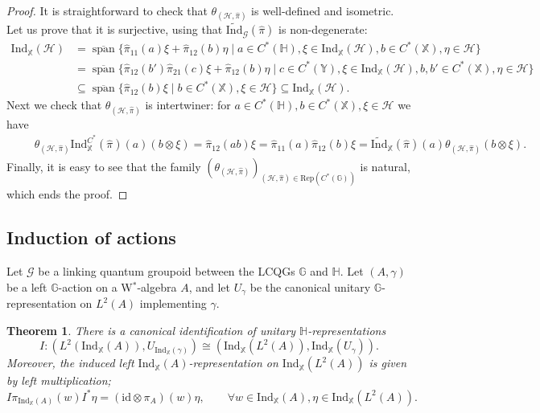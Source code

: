 \documentclass[reqno]{amsart}
\numberwithin{equation}{section}
\newtheorem{Theorem}{Theorem}[section]
\newcommand{\id}{\mathrm{id}}
\newcommand{\G}{\mathbb{G}}
\newcommand{\Hh}{\mathbb{H}}
\newcommand{\X}{\mathbb{X}}
\newcommand{\Y}{\mathbb{Y}}
\newcommand{\msG}{\mathscr{G}}
\newcommand{\Rep}{\mathrm{Rep}}
\newcommand{\Ind}{\mathrm{Ind}}
\newcommand{\ov}{\overline}
\newcommand{\mc}{\mathcal}
\newcommand{\HH}{\mathbb{H}}
\newcommand{\GG}{\mathbb{G}}
\begin{document}
\begin{proof}
It is straightforward to check that $\theta_{(\mc{H},\hat{\pi})}$ is well-defined and isometric. Let us prove that it is surjective, using that $\widetilde{\Ind}_{\msG}(\hat{\pi})$ is non-degenerate:
\[\begin{split}
\Ind_{\X}(\mc{H})&=
\ov{\operatorname{span}}\{ \hat{\pi}_{11}(a)\xi + \hat{\pi}_{12}(b)\eta\mid a\in C^*(\HH),\xi\in \Ind_{\X}(\mc{H}), b\in C^*(\X), \eta\in \mc{H}\}\\
&=
\ov{\operatorname{span}}\{ \hat{\pi}_{12}(b')\hat{\pi}_{21}(c)\xi + \hat{\pi}_{12}(b)\eta\mid c\in C^*(\Y),\xi\in \Ind_{\X}(\mc{H}), b,b'\in C^*(\X), \eta\in \mc{H}\}\\
&\subseteq 
\ov{\operatorname{span}}\{  \hat{\pi}_{12}(b)\xi\mid b\in C^*(\X),\xi\in \mc{H} \}\subseteq \Ind_{\X}(\mc{H}).
\end{split}\]
Next we check that $\theta_{(\mc{H},\hat{\pi})}$ is intertwiner: for $a\in C^*(\HH),b\in C^*(\X),\xi\in \mc{H}$ we have
\[\begin{split}
&\quad\;
\theta_{(\mc{H},\hat{\pi})} \Ind_{\X}^{C^*}(\hat{\pi})(a) (b\otimes \xi)=
 \hat{\pi}_{12}(ab)\xi=
 \hat{\pi}_{11}(a)\hat{\pi}_{12}(b)\xi=
 \widetilde{\Ind}_{\X}(\hat{\pi})(a) \theta_{(\mc{H},\hat{\pi})}(b\otimes \xi).
\end{split}\]
Finally, it is easy to see that the family $(\theta_{(\mc{H},\hat{\pi})})_{(\mc{H},\hat{\pi})\in \Rep(C^*(\GG))}$ is natural, which ends the proof.
\end{proof}

\subsection{Induction of actions}\label{SubSecStatement}


Let $\msG$ be a linking quantum groupoid between the LCQGs $\G$ and $\Hh$. Let  $(A,\gamma)$ be a left $\G$-action on a W$^*$-algebra $A$, and let $U_{\gamma}$ be the canonical unitary $\G$-representation on $L^2(A)$ implementing $\gamma$.


\begin{Theorem}\label{TheoIndL}
There is a canonical identification of unitary $\Hh$-representations
\[
I\colon (L^2(\Ind_{\X}(A)),U_{\Ind_{\X}(\gamma)}) \cong (\Ind_{\X}(L^2(A)),\Ind_{\X}(U_{\gamma})).
\]
Moreover, the induced left $\Ind_{\X}(A)$-representation on $\Ind_{\X}(L^2(A))$ is given by left multiplication;
\[
I\pi_{\Ind_{\X}(A)}(w)I^* \eta = (\id\otimes \pi_A)(w)\eta,\qquad \forall w\in \Ind_{\X}(A), \eta\in \Ind_{\X}(L^2(A)).  
\]
\end{Theorem}
\end{document}
